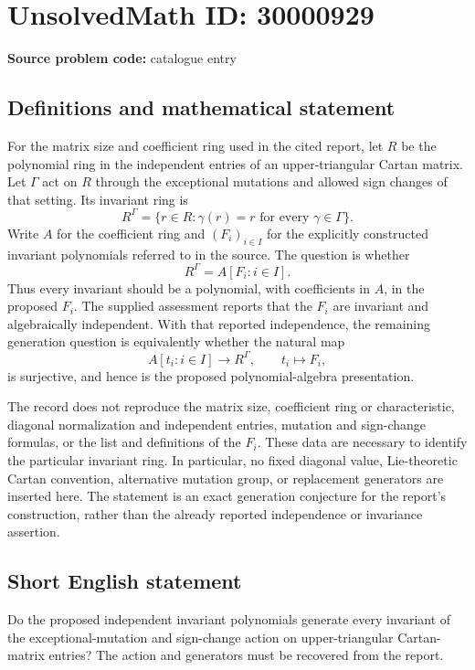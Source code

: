 \documentclass[11pt]{article}
\begin{document}
\section*{UnsolvedMath ID: 30000929}
\textbf{Source problem code:} catalogue entry
\subsection{Definitions and mathematical statement}
For the matrix size and coefficient ring used in the cited report, let \(R\) be the polynomial ring in the independent entries of an upper-triangular Cartan matrix. Let \(\Gamma\) act on \(R\) through the exceptional mutations and allowed sign changes of that setting. Its invariant ring is
\[
R^\Gamma=\{r\in R:\gamma(r)=r\text{ for every }\gamma\in\Gamma\}.
\]
Write \(A\) for the coefficient ring and \((F_i)_{i\in I}\) for the explicitly constructed invariant polynomials referred to in the source. The question is whether
\[
R^\Gamma=A[F_i:i\in I].
\]
Thus every invariant should be a polynomial, with coefficients in \(A\), in the proposed \(F_i\). The supplied assessment reports that the \(F_i\) are invariant and algebraically independent. With that reported independence, the remaining generation question is equivalently whether the natural map
\[
A[t_i:i\in I]\longrightarrow R^\Gamma,\qquad t_i\longmapsto F_i,
\]
is surjective, and hence is the proposed polynomial-algebra presentation.

The record does not reproduce the matrix size, coefficient ring or characteristic, diagonal normalization and independent entries, mutation and sign-change formulas, or the list and definitions of the \(F_i\). These data are necessary to identify the particular invariant ring. In particular, no fixed diagonal value, Lie-theoretic Cartan convention, alternative mutation group, or replacement generators are inserted here. The statement is an exact generation conjecture for the report's construction, rather than the already reported independence or invariance assertion.
\subsection{Short English statement}
Do the proposed independent invariant polynomials generate every invariant of the exceptional-mutation and sign-change action on upper-triangular Cartan-matrix entries? The action and generators must be recovered from the report.
\end{document}
